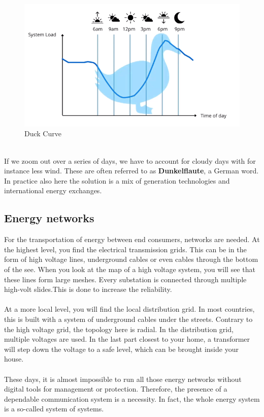 \documentclass[../summary.tex]{subfiles}
\begin{document}
	\begin{figure}[H]
		\centering
		\includegraphics[width=0.6\linewidth]{../images/4-duck-curve}
		\caption{Duck Curve}
		\label{fig:duck-curve}
	\end{figure}
	
	\ \\
	If we zoom out over a series of days, we have to account for cloudy days with for instance less wind. These are often referred to as \textbf{Dunkelflaute}, a German word. In practice also here the solution is a mix of generation technologies and international energy exchanges.
	
	\subsection{Energy networks}
	
	For the transportation of energy between end consumers, networks are needed. At the highest level, you find the electrical transmission grids. This can be in the form of high voltage lines, underground cables or even cables through the bottom of the see. When you look at the map of a high voltage system, you will see that these lines form large meshes. Every substation is connected through multiple high-volt slides.This is done to increase the reliability. 
	\\\\
	At a more local level, you will find the local distribution grid. In most countries, this is built with a system of underground cables under the streets. Contrary to the high voltage grid, the topology here is radial. In the distribution grid, multiple voltages are used. In the last part closest to your home, a transformer will step down the voltage to a safe level, which can be brought inside your house. 
	\\\\
	These days, it is almost impossible to run all those energy networks without digital tools for management or protection. Therefore, the presence of a dependable communication system is a necessity. In fact, the whole energy system is a so-called system of systems.
	
\end{document}
